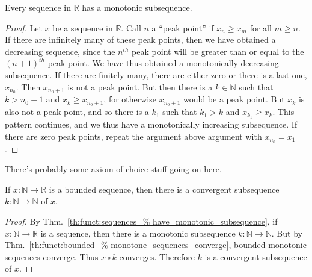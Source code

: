             \begin{theorem}
                \label{th:funct:sequences_have_%
                       monotonic_subsequence}
                Every sequence in $\mathbb{R}$
                has a monotonic subsequence.
            \end{theorem}
            \begin{proof}
                Let $x$ be a sequence in $\mathbb{R}$.
                Call $n$ a ``peak point'' if
                $x_{n}\geq{x_{m}}$ for all
                ${m}\geq{n}$. If there are infinitely many
                of these peak points, then we have obtained
                a decreasing sequence, since the $n^{th}$
                peak point will be greater than or equal to
                the $(n+1)^{th}$ peak point.
                We have thus obtained
                a monotonically decreasing subsequence.
                If there are finitely many,
                there are either zero or there is a last one,
                $x_{n_{0}}$. Then $x_{n_{0}+1}$ is not a
                peak point. But then there is a
                $k\in\mathbb{N}$ such that $k>n_{0}+1$ and
                $x_{k}\geq{x_{n_{0}+1}}$, for otherwise
                $x_{n_{0}+1}$ would be a peak point. But
                $x_{k}$ is also not a peak point, and so
                there is a $k_{1}$ such that $k_{1}>k$ and
                $x_{k_{1}}\geq{x_{k}}$. This pattern
                continues, and we thus have a monotonically
                increasing subsequence. If there are zero
                peak points, repeat the argument above
                argument with $x_{n_{0}}=x_{1}$.
            \end{proof}
            There's probably some axiom of choice stuff
            going on here.
            \begin{theorem}
                If $x:\mathbb{N}\rightarrow\mathbb{R}$
                is a bounded sequence, then there is
                a convergent subsequence
                $k:\mathbb{N}\rightarrow\mathbb{N}$
                of $x$.
            \end{theorem}
            \begin{proof}
                By Thm.~\ref{th:funct:sequences_%
                             have_monotonic_subsequence},
                if $x:\mathbb{N}\rightarrow\mathbb{R}$ is a
                sequence, then there is a monotonic subsequence
                $k:\mathbb{N}\rightarrow\mathbb{N}$.
                But by Thm.~\ref{th:funct:bounded_%
                                 monotone_sequences_converge},
                bounded monotonic sequences converge.
                Thus $x\circ{k}$ converges.
                Therefore $k$ is a convergent
                subsequence of $x$.
            \end{proof}
